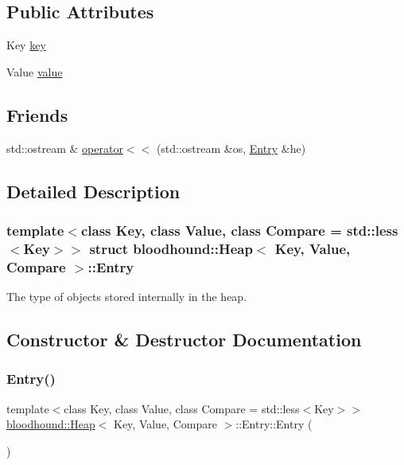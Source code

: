 \subsection*{Public Attributes}
\begin{DoxyCompactItemize}
\item 
Key \hyperlink{structbloodhound_1_1Heap_1_1Entry_abc30d59b3c7bd01c36df918c8a2dd597}{key}
\item 
Value \hyperlink{structbloodhound_1_1Heap_1_1Entry_a4f777f54235490b4eb2f0f3af22b9c8b}{value}
\end{DoxyCompactItemize}
\subsection*{Friends}
\begin{DoxyCompactItemize}
\item 
std\+::ostream \& \hyperlink{structbloodhound_1_1Heap_1_1Entry_a885f1645de32df3dbfbf9f2f47f7ea1f}{operator$<$$<$} (std\+::ostream \&os, \hyperlink{structbloodhound_1_1Heap_1_1Entry}{Entry} \&he)
\end{DoxyCompactItemize}


\subsection{Detailed Description}
\subsubsection*{template$<$class Key, class Value, class Compare = std\+::less$<$\+Key$>$$>$\newline
struct bloodhound\+::\+Heap$<$ Key, Value, Compare $>$\+::\+Entry}

The type of objects stored internally in the heap. 

\subsection{Constructor \& Destructor Documentation}
\mbox{\label{structbloodhound_1_1Heap_1_1Entry_ad445248902c7d7f3e79bf58acf24e58b}} 
\subsubsection{\texorpdfstring{Entry()}{Entry()}\hspace{0.1cm}{\footnotesize\ttfamily [1/2]}}
{\footnotesize\ttfamily template$<$class Key, class Value, class Compare = std\+::less$<$\+Key$>$$>$ \\
\hyperlink{classbloodhound_1_1Heap}{bloodhound\+::\+Heap}$<$ Key, Value, Compare $>$\+::Entry\+::\+Entry (\begin{DoxyParamCaption}{ }\end{DoxyParamCaption})\hspace{0.3cm}{\ttfamily [default]}}

